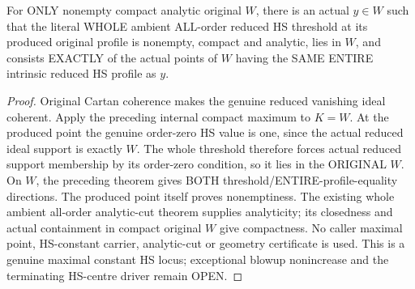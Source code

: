 \begin{theorem}
\label{hir:actual-original-compact-reduced-constant-maximal-hs-locus}
\leanok
For ONLY nonempty compact analytic original $W$, there is an actual
$y\in W$ such that the literal WHOLE ambient ALL-order reduced HS threshold
at its produced original profile is nonempty, compact and analytic,
lies in $W$, and consists EXACTLY of the actual points of $W$ having
the SAME ENTIRE intrinsic reduced HS profile as $y$.
\end{theorem}
\begin{proof}
Original Cartan coherence makes the genuine reduced vanishing ideal
coherent. Apply the preceding internal compact maximum to $K=W$.
At the produced point the genuine order-zero HS value is one, since
the actual reduced ideal support is exactly $W$. The whole threshold
therefore forces actual reduced support membership by its order-zero
condition, so it lies in the ORIGINAL $W$. On $W$, the preceding theorem
gives BOTH threshold/ENTIRE-profile-equality directions. The produced
point itself proves nonemptiness. The existing whole ambient all-order
analytic-cut theorem supplies analyticity; its closedness and actual
containment in compact original $W$ give compactness. No caller maximal
point, HS-constant carrier, analytic-cut or geometry certificate is used.
This is a genuine maximal constant HS locus; exceptional blowup
nonincrease and the terminating HS-centre driver remain OPEN.
\end{proof}
